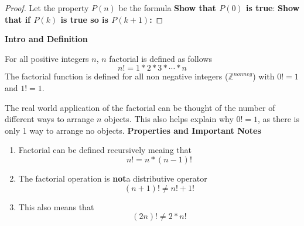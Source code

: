 \documentclass[addpoints]{exam}
\begin{document}
    \else
    \begin{proof}
      Let the property $P(n)$ be the formula 
      \vspace{0.5in}
      \newline \textbf{Show that $P(0)$ is true}:
      \vspace{1.5in}
      \newline \textbf{Show that if $P(k)$ is true so is $P(k+1)$:}
      \vspace{2in}
      \newline
    \end{proof}
    \fi
    \newpage 
        \begin{tcolorbox}[breakable, title=FACTORIAL REVIEW, colframe=black, sharp corners, colback=white, colbacktitle=white, coltitle=black]
          \Large\textbf{Intro and Definition}
          \normalsize
          \begin{tcolorbox}[breakable, title=DEFINITION, colframe=black, sharp corners, colback=white, colbacktitle=white, coltitle=black]
            For all positive integers $n$, $n$ factorial is defined as follows
            \[
              n\textbf{!} = 1 * 2 * 3 * \cdots * n
            \]
            The factorial function is defined for all non negative integers ($\mathbb{Z}^{nonneg}$) with $0\textbf{!} = 1$ and $1\textbf{!} = 1$.
        \end{tcolorbox}
        The real world application of the factorial can be thought of the number of different ways to arrange $n$ objects. This also helps explain why $0\textbf{!} = 1$, as there is only 1 way to arrange no objects.
      \vspace{0.1in}
      \noindent\makebox[\linewidth]{\hrulefill}
      \newline
      \Large\textbf{Properties and Important Notes}
      \normalsize
        \begin{tcolorbox}[breakable, title=PROPERTIES, colframe=black, sharp corners, colback=white, colbacktitle=white, coltitle=black]
          \begin{enumerate}
            \item Factorial can be defined recursively meaing that 
              \[
                n\textbf{!} = n * \left(n-1\right)\textbf{!}
              \]
            \item The factorial operation is \textbf{not}a distributive operator
              \[
                (n+1)\textbf{!} \ne n\textbf{!} + 1\textbf{!}
              \]
            \item This also means that 
              \[
                \left(2n\right)\textbf{!} \ne 2 * n\textbf{!}
              \]
          \end{enumerate}
        \end{tcolorbox}
    \end{tcolorbox}
\end{document}
